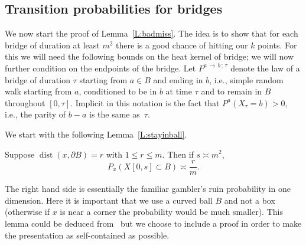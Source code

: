 \documentclass[AHL, Unicode, longabstracts, published]{cedram}
\DeclareMathOperator{\dist}{dist}
\newcommand{\Pmh}{P}
\begin{document}
\subsection{Transition probabilities for bridges}
\label{S:bridge_trans}

We now start the proof of Lemma~\ref{L:badmiss}. The idea is to show that for each bridge of duration at least $m^2$ there is a good chance of hitting our $k$ points. For this we will need the following bounds on the heat kernel of bridge; we will now further condition on the endpoints of the bridge. Let $\Pmh^{a\,\to\,b\,;\,\tau}$ denote the law of a bridge of duration $\tau$ starting from $a \in B$ and ending in $b$, i.e., simple random walk starting from $a$, conditioned to be in $b$ at time $\tau$ and to remain in $B$ throughout $[0, \tau]$. Implicit in this notation is the fact that $\Pmh^a (X_\tau = b) >0$, i.e., the parity of $b-a$ is the same as~$\tau$.

We start with the following Lemma~\ref{L:stayinball}.

\begin{lemm}\label{L:stayinball}
Suppose $\dist (x, \partial B) =r$ with $1\le r \le m$. Then if $s \asymp m^2$,
\begin{equation}\label{eq:Exc}
\Pmh_x(X[0, s] \subset B) \asymp \frac{r}{m}.
\end{equation}
\end{lemm}

The right hand side is essentially the familiar gambler's ruin probability in one dimension. Here it is important that we use a curved ball $B$ and not a box (otherwise if $x$ is near a corner the probability would be much smaller). This lemma could be deduced from~\cite[Proposition~6.9.4]{LL} but we choose to include a proof in order to make the presentation as self-contained as possible.
\end{document}
